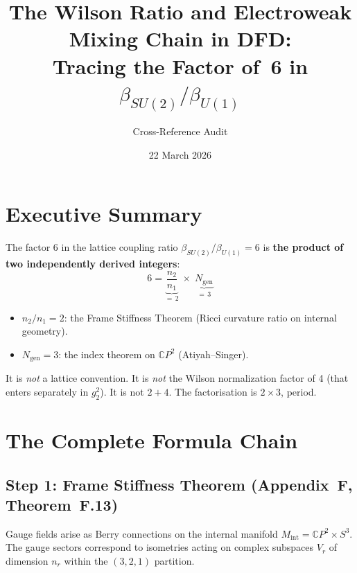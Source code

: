 \documentclass[11pt]{article}
\title{The Wilson Ratio and Electroweak Mixing Chain in DFD:\\
Tracing the Factor of~6 in $\beta_{SU(2)}/\beta_{U(1)}$}
\author{Cross-Reference Audit}
\date{22 March 2026}
\begin{document}
\maketitle

\section{Executive Summary}

The factor 6 in the lattice coupling ratio
$\beta_{SU(2)}/\beta_{U(1)} = 6$
is \textbf{the product of two independently derived integers}:
\begin{equation}\label{eq:six}
\boxed{6 = \underbrace{\frac{n_2}{n_1}}_{=\,2}
      \;\times\;
      \underbrace{N_{\mathrm{gen}}}_{=\,3}}
\end{equation}

\begin{itemize}
\item $n_2/n_1 = 2$: the Frame Stiffness Theorem
      (Ricci curvature ratio on internal geometry).
\item $N_{\mathrm{gen}} = 3$: the index theorem on
      $\mathbb{C}P^2$ (Atiyah--Singer).
\end{itemize}

It is \emph{not} a lattice convention. It is \emph{not} the Wilson
normalization factor of 4 (that enters separately in $g_2^2$).
It is not $2+4$.  The factorisation is $2 \times 3$, period.

\section{The Complete Formula Chain}

\subsection{Step 1: Frame Stiffness Theorem (Appendix~F, Theorem~F.13)}

Gauge fields arise as Berry connections on the internal manifold
$M_{\mathrm{int}} = \mathbb{C}P^2 \times S^3$.
The gauge sectors correspond to isometries acting on complex subspaces
$V_r$ of dimension $n_r$ within the $(3,2,1)$ partition.
\end{document}
